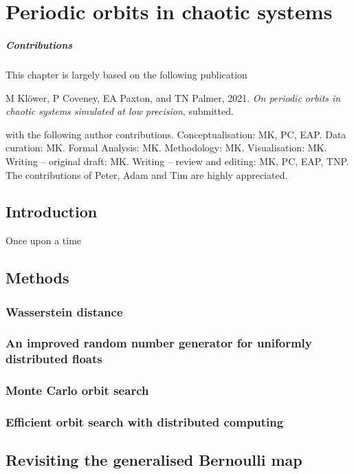 \chapter{Periodic orbits in chaotic systems}
\label{chap:orbits}

\paragraph{Contributions} This chapter is largely based on the following publication

\vspace{\baselineskip}
\indent M Klöwer, P Coveney, EA Paxton, and TN Palmer, 2021. \emph{On periodic orbits in chaotic systems simulated at low precision}, submitted.
\vspace{\baselineskip}

\noindent with the following author contributions. Conceptualisation: MK, PC, EAP. Data curation: MK. Formal Analysis: MK. Methodology: MK. Visualisation: MK. Writing – original draft: MK. Writing – review and editing: MK, PC, EAP, TNP. The contributions of Peter, Adam and Tim are highly appreciated.

\section{Introduction}

Once upon a time

\section{Methods}
\subsection{Wasserstein distance}
\subsection{An improved random number generator for uniformly distributed floats}
\subsection{Monte Carlo orbit search}
\subsection{Efficient orbit search with distributed computing}

\section{Revisiting the generalised Bernoulli map}
